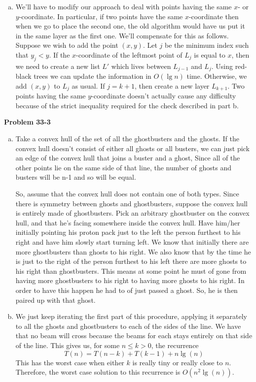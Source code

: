 \documentclass{article}
\begin{document}
\begin{enumerate}[a.]
\item We'll have to modify our approach to deal with points having the same $x$- or $y$-coordinate. In particular, if two points have the same $x$-coordinate then when we go to place the second one, the old algorithm would have us put it in the same layer as the first one.  We'll compensate for this as follows.  Suppose we wish to add the point $(x,y)$.  Let $j$ be the minimum index such that $y_j < y$.  If the $x$-coordinate of the leftmost point of $L_j$ is equal to $x$, then we need to create a new list $L'$ which lives between $L_{j-1}$ and $L_j$.  Using red-black trees we can update the information in $O(\lg n)$ time. Otherwise, we add $(x,y)$ to $L_j$ as usual.  If $j=k+1$, then create a new layer $L_{k+1}$.  Two points having the same $y$-coordinate doesn't actually cause any difficulty because of the strict inequality required for the check described in part b. 
\end{enumerate}

\noindent\textbf{Problem 33-3}\\
\begin{enumerate}[a.]
\item
Take a convex hull of the set of all the ghostbusters and the ghosts. If the convex hull doesn't consist of either all ghosts or all busters, we can just pick an edge of the convex hull that joins a buster and a ghost, Since all of the other points lie on the same side of that line, the number of ghosts and busters will be n-1 and so will be equal.

So, assume that the convex hull does not contain one of both types. Since there is symmetry between ghosts and ghostbusters, suppose the convex hull is entirely made of ghostbusters. Pick an arbitrary ghostbuster on the convex hull, and that he's facing somewhere inside the convex hull. Have him/her initially pointing his proton pack just to the left the person furthest to his right and have him slowly start turning left. We know that initially there are more ghostbusters than ghosts to his right. We also know that by the time he is just to the right of the person furthest to his left there are more ghosts to his right than ghostbusters. This means at some point he must of gone from having more ghostbusters to his right to having more ghosts to his right. In order to have this happen he had to of just passed a ghost. So, he is then paired up with that ghost. 
\item
We just keep iterating the first part of this procedure, applying it separately to all the ghosts and ghostbusters to each of the sides of the line. We have that no beam will cross because the beams for each stays entirely on that side of the line. This gives us, for some $n\le k>0$, the recurrence
\[
T(n) = T(n-k) +T(k-1) + n\lg(n)
\]
This has the worst case when either $k$ is really tiny or really close to $n$. Therefore, the worst case solution to this recurrence is $O(n^2\lg(n))$.
\end{enumerate}
\end{document}
